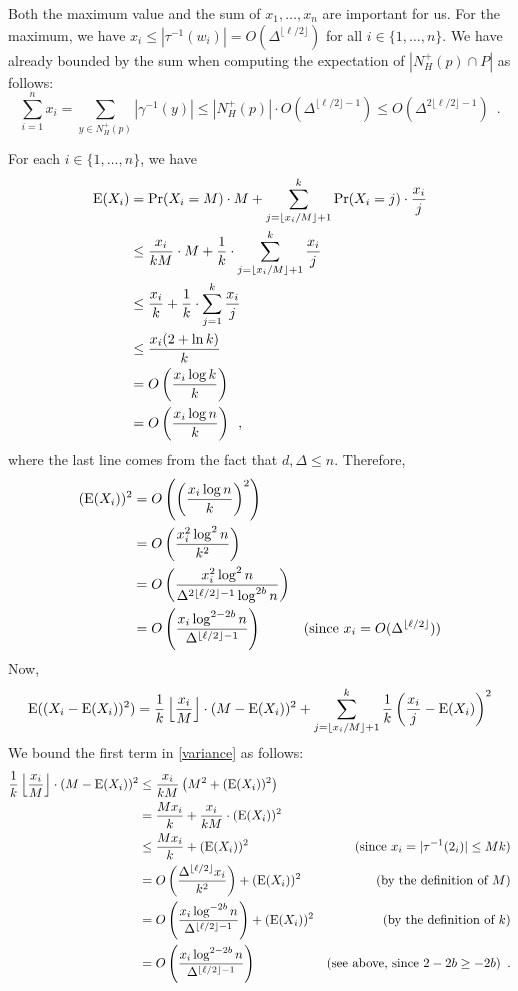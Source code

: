 \documentclass{patmorin}
\begin{document}
Both the maximum value and the sum of $x_1,\ldots,x_n$ are important for us. For the maximum, we have $x_i\le|\tau^{-1}(w_i)|= O(\Delta^{\lfloor\ell/2\rfloor})$ for all $i\in\{1,\ldots,n\}$.  We have already bounded by the sum when computing the expectation of $|N_H^+(p)\cap P|$ as follows:
\[
  \sum_{i=1}^n x_i = \sum_{y\in N^+_H(p)} |\gamma^{-1}(y)|
  \le |N^+_H(p)|\cdot O(\Delta^{\lfloor\ell/2\rfloor-1})
  \le O(\Delta^{2\lfloor\ell/2\rfloor-1}) \enspace .
\]

For each $i\in\{1,\ldots,n\}$, we have
\begin{align*}
  \mathrm{E}(X_i)
  & =\Pr(X_i=M)\cdot M + \sum_{j=\lfloor x_i/M\rfloor+1}^k \Pr(X_i=j)\cdot\frac{x_i}{j} \\
  & \le\frac{x_i}{kM}\cdot M + \frac{1}{k}\cdot\sum_{j=\lfloor x_i/M\rfloor+1}^k \frac{x_i}{j} \\
  & \le\frac{x_i}{k} + \frac{1}{k}\cdot\sum_{j=1}^k \frac{x_i}{j} \\
  & \le \frac{x_i(2+\ln k)}{k} \\
  & = O\left(\frac{x_i\log k}{k}\right) \\
  & = O\left(\frac{x_i\log n}{k}\right)
  \enspace ,
\end{align*}
where the last line comes from the fact that $d,\Delta \le n$.
Therefore,
\begin{align*}
  (\mathrm{E}(X_i))^2
  & = O\left(\left(\frac{x_i\log n}{k}\right)^2\right) \\
  & = O\left(\frac{x_i^2\log^2 n}{k^2}\right) \\
  & = O\left(\frac{x_i^2\log^2 n}{\Delta^{2\lfloor\ell/2\rfloor-1}\log^{2b} n}\right) \\
  & = O\left(\frac{x_i\log^{2-2b} n}{\Delta^{\lfloor\ell/2\rfloor-1}}\right)
  & \text{(since $x_i=O(\Delta^{\lfloor\ell/2\rfloor})$)} \\
\end{align*}
Now,
\begin{equation}
  \mathrm{E}((X_i-\mathrm{E}(X_i))^2)  = \frac{1}{k}\left\lfloor\frac{x_i}{M}\right\rfloor\cdot(M-\mathrm{E}(X_i))^2 + \sum_{j=\lfloor x_i/M\rfloor+1}^k \frac{1}{k}\left(\frac{x_i}{j}-\mathrm{E}(X_i)\right)^2 \label{variance}
\end{equation}
We bound the first term in \cref{variance} as follows:
\begin{align*}
  \frac{1}{k}\left\lfloor\frac{x_i}{M}\right\rfloor\cdot(M-\mathrm{E}(X_i))^2
  & \le \frac{x_i}{kM}\left(M^2 + (\mathrm{E}(X_i))^2\right) \\
  & = \frac{M x_i}{k} + \frac{x_i}{kM}\cdot (\mathrm{E}(X_i))^2 \\
  & \le \frac{M x_i}{k} + (\mathrm{E}(X_i))^2
  & \text{(since $x_i=|\tau^{-1}(2_i)|\le Mk$)}\\
  & = O\left(\frac{\Delta^{\lfloor\ell/2\rfloor}x_i}{k^2}\right) + (\mathrm{E}(X_i))^2
  & \text{(by the definition of $M$)}\\
  & = O\left(\frac{x_i\log^{-2b} n}{\Delta^{\lfloor\ell/2\rfloor-1}}\right) + (\mathrm{E}(X_i))^2
  & \text{(by the definition of $k$)}\\
  & = O\left(\frac{x_i\log^{2-2b} n}{\Delta^{\lfloor\ell/2\rfloor-1}}\right)
  & \text{(see above, since $2-2b\ge -2b$)} \enspace .
\end{align*}
\end{document}
